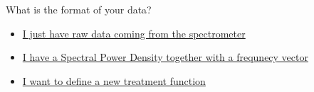 \begin{tcolorbox}
    What is the format of your data?
    \begin{itemize}
        \item \hyperref[subsec:treatment.toPSD]{I just have raw data coming from the spectrometer}
        \item \hyperref[subsec:treatment.toInfo]{I have a Spectral Power Density together with a frequnecy vector}
        \item \hyperref[subsec:treatment.new]{I want to define a new treatment function}
    \end{itemize}
\end{tcolorbox}
